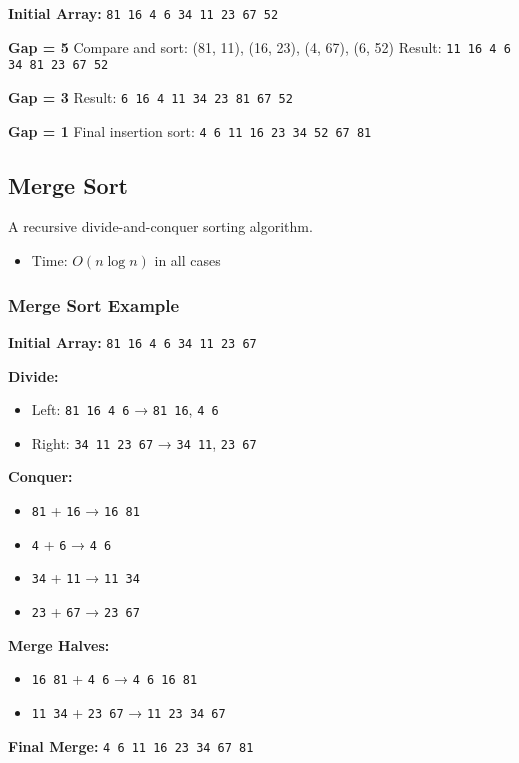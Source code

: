 \documentclass[11pt]{article}
\begin{document}
\textbf{Initial Array:} \verb|81 16 4 6 34 11 23 67 52|

\textbf{Gap = 5}  
Compare and sort: (81, 11), (16, 23), (4, 67), (6, 52)  
Result: \verb|11 16 4 6 34 81 23 67 52|

\textbf{Gap = 3}  
Result: \verb|6 16 4 11 34 23 81 67 52|

\textbf{Gap = 1}  
Final insertion sort: \verb|4 6 11 16 23 34 52 67 81|

\subsection*{Merge Sort}
A recursive divide-and-conquer sorting algorithm.

\begin{itemize}
  \item Time: $O(n \log n)$ in all cases
\end{itemize}

\subsubsection*{Merge Sort Example}

\textbf{Initial Array:} \verb|81 16 4 6 34 11 23 67|

\textbf{Divide:}
\begin{itemize}
  \item Left: \verb|81 16 4 6| → \verb|81 16|, \verb|4 6|
  \item Right: \verb|34 11 23 67| → \verb|34 11|, \verb|23 67|
\end{itemize}

\textbf{Conquer:}
\begin{itemize}
  \item \verb|81| + \verb|16| → \verb|16 81|
  \item \verb|4| + \verb|6| → \verb|4 6|
  \item \verb|34| + \verb|11| → \verb|11 34|
  \item \verb|23| + \verb|67| → \verb|23 67|
\end{itemize}

\textbf{Merge Halves:}
\begin{itemize}
  \item \verb|16 81| + \verb|4 6| → \verb|4 6 16 81|
  \item \verb|11 34| + \verb|23 67| → \verb|11 23 34 67|
\end{itemize}

\textbf{Final Merge:}
\verb|4 6 11 16 23 34 67 81|
\end{document}
